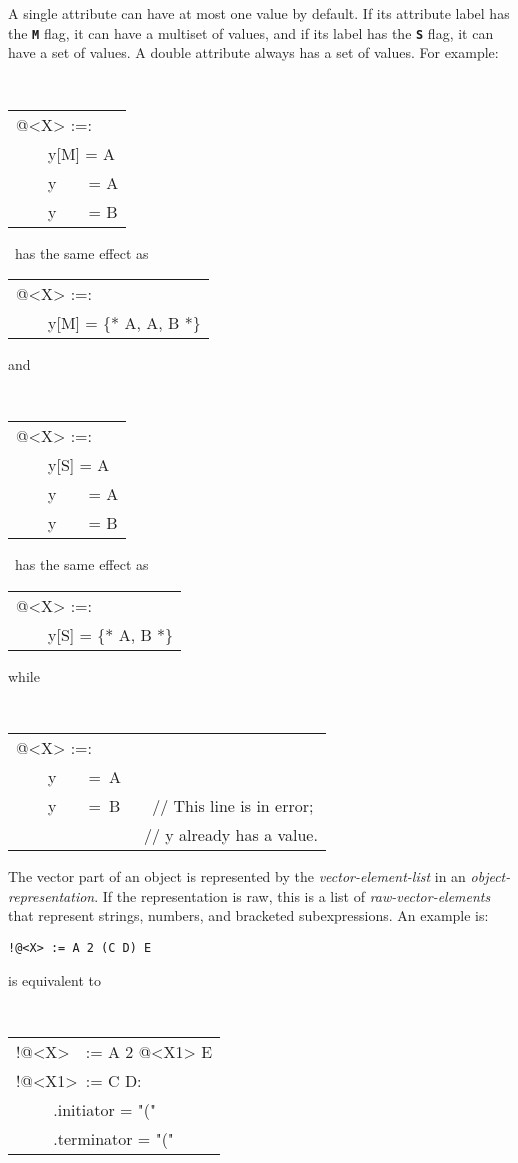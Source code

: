 \documentclass[12pt]{article}
\newcommand{\TT}[1]{{\tt \bfseries #1}}
\newenvironment{indpar}[1][0.3in]%
	{\begin{list}{}%
		     {\setlength{\itemsep}{0in}%
		      \setlength{\topsep}{0in}%
		      \setlength{\parsep}{1ex}%
		      \setlength{\labelwidth}{#1}%
		      \setlength{\leftmargin}{#1}%
		      \addtolength{\leftmargin}{\labelsep}}%
	 \item}%
	{\end{list}}
\begin{document}
A single attribute can have at most one value by default.
If its attribute label has the \TT{M} flag\label{M-FLAG}, it can have
a multiset of values,
and if its label has the \TT{S} flag\label{S-FLAG}, it can have
a set of values.  A double attribute always has a set of values.
For example:
\begin{indpar}
\tt
\begin{tabular}{l}
@<X> :=: \\
~~~~y[M] = A \\
~~~~y~~~~= A \\
~~~~y~~~~= B \\
\end{tabular}
~{\rm has the same effect as}~
\begin{tabular}{l}
@<X> :=: \\
~~~~y[M] = \{* A, A, B *\} \\
\end{tabular}
\end{indpar}
and
\begin{indpar}
\tt
\begin{tabular}{l}
@<X> :=: \\
~~~~y[S] = A \\
~~~~y~~~~= A \\
~~~~y~~~~= B \\
\end{tabular}
~{\rm has the same effect as}~
\begin{tabular}{l}
@<X> :=: \\
~~~~y[S] = \{* A, B *\} \\
\end{tabular}
\end{indpar}
while
\begin{indpar}
\tt
\begin{tabular}{l}
@<X> :=: \\
~~~~y~~~~=~A \\
~~~~y~~~~=~B~~~~// This line is in error; \\
~~~~~~~~~~~~~~~~// y already has a value. \\
\end{tabular}
\end{indpar}

The vector part of an object is represented by the {\em vector-element-list}
in an {\em object-representation}.  If the representation is raw,
this is a list of {\em raw-vector-elements} that represent strings, numbers,
and bracketed subexpressions.  An example is:
\begin{indpar}
\begin{indpar}
{\tt !@<X> := A 2 (C D) E}
\end{indpar}
is equivalent to
\begin{indpar}
\tt
\begin{tabular}{l}
!@<X>~~:= A 2 @<X1> E \\
!@<X1>~:= C D: \\
~~~~ .initiator = "(" \\
~~~~ .terminator = "(" \\
\end{tabular}
\end{indpar}
\end{indpar}
\end{document}
